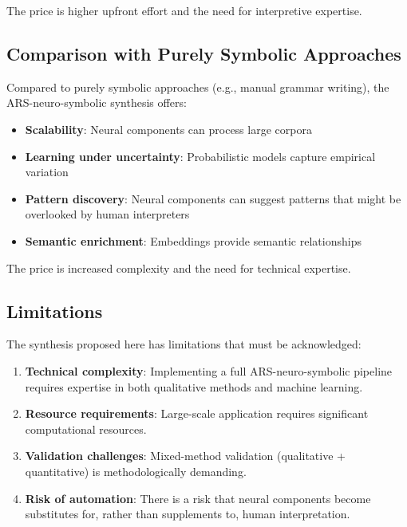 \documentclass[12pt,a4paper]{article}
\begin{document}
The price is higher upfront effort and the need for interpretive expertise.

\subsection{Comparison with Purely Symbolic Approaches}

Compared to purely symbolic approaches (e.g., manual grammar writing), the 
ARS-neuro-symbolic synthesis offers:

\begin{itemize}
    \item \textbf{Scalability}: Neural components can process large corpora
    \item \textbf{Learning under uncertainty}: Probabilistic models capture 
    empirical variation
    \item \textbf{Pattern discovery}: Neural components can suggest patterns 
    that might be overlooked by human interpreters
    \item \textbf{Semantic enrichment}: Embeddings provide semantic relationships
\end{itemize}

The price is increased complexity and the need for technical expertise.

\subsection{Limitations}

The synthesis proposed here has limitations that must be acknowledged:

\begin{enumerate}
    \item \textbf{Technical complexity}: Implementing a full ARS-neuro-symbolic 
    pipeline requires expertise in both qualitative methods and machine learning.
    
    \item \textbf{Resource requirements}: Large-scale application requires 
    significant computational resources.
    
    \item \textbf{Validation challenges}: Mixed-method validation (qualitative + 
    quantitative) is methodologically demanding.
    
    \item \textbf{Risk of automation}: There is a risk that neural components 
    become substitutes for, rather than supplements to, human interpretation.
\end{enumerate}
\end{document}
